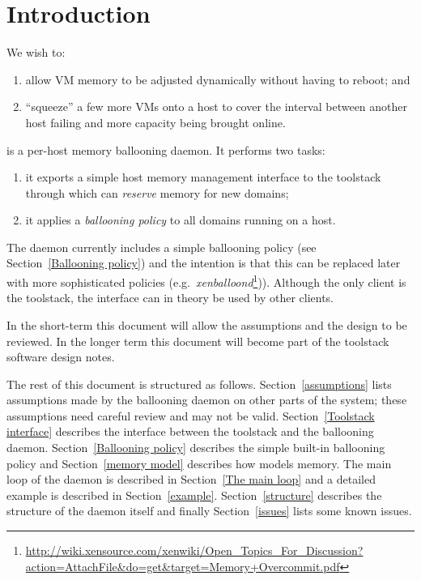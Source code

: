 \documentclass{article}
\begin{document}



\section{Introduction}

We wish to:
\begin{enumerate}
\item allow VM memory to be adjusted dynamically without having to reboot; and
\item ``squeeze'' a few more VMs onto a host to cover the interval between another host failing and more capacity being brought online.
\end{enumerate}

\squeezed{} is a per-host memory ballooning daemon. It performs two tasks:
\begin{enumerate}
\item it exports a simple host memory management interface to the \xapi{} toolstack through which \xapi{} can {\em reserve} memory for new domains;
\item it applies a {\em ballooning policy} to all domains running on a host.
\end{enumerate}
The daemon currently includes a simple ballooning policy (see Section~\ref{Ballooning policy}) and the intention is that this can be replaced later with more sophisticated policies (e.g.\ {\em xenballoond}\footnote{\url{http://wiki.xensource.com/xenwiki/Open_Topics_For_Discussion?action=AttachFile&do=get&target=Memory+Overcommit.pdf}})). Although the only client is the \xapi{} toolstack, the interface can in theory be used by other clients.

In the short-term this document will allow the assumptions and the design to be reviewed. In the longer term this document will become part of the \xapi{} toolstack software design notes.

The rest of this document is structured as follows. Section~\ref{assumptions} lists assumptions made by the ballooning daemon on other parts of the system; these assumptions need careful review and may not be valid. Section~\ref{Toolstack interface} describes the interface between the toolstack and the ballooning daemon. Section~\ref{Ballooning policy} describes the simple built-in ballooning policy and Section~\ref{memory model} describes how \squeezed{} models memory. The main loop of the daemon is described in Section~\ref{The main loop} and a detailed example is described in Section~\ref{example}. Section~\ref{structure} describes the structure of the daemon itself and finally Section~\ref{issues} lists some known issues.
\end{document}
